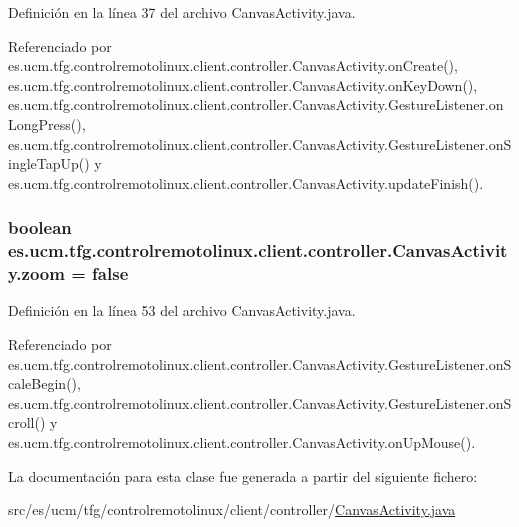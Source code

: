 Definición en la línea 37 del archivo Canvas\-Activity.\-java.



Referenciado por es.\-ucm.\-tfg.\-controlremotolinux.\-client.\-controller.\-Canvas\-Activity.\-on\-Create(), es.\-ucm.\-tfg.\-controlremotolinux.\-client.\-controller.\-Canvas\-Activity.\-on\-Key\-Down(), es.\-ucm.\-tfg.\-controlremotolinux.\-client.\-controller.\-Canvas\-Activity.\-Gesture\-Listener.\-on\-Long\-Press(), es.\-ucm.\-tfg.\-controlremotolinux.\-client.\-controller.\-Canvas\-Activity.\-Gesture\-Listener.\-on\-Single\-Tap\-Up() y es.\-ucm.\-tfg.\-controlremotolinux.\-client.\-controller.\-Canvas\-Activity.\-update\-Finish().

\hypertarget{classes_1_1ucm_1_1tfg_1_1controlremotolinux_1_1client_1_1controller_1_1CanvasActivity_a24f84d52429b8d6256f422a949f76ac2}{
\subsubsection[{zoom}]{\setlength{\rightskip}{0pt plus 5cm}boolean es.\-ucm.\-tfg.\-controlremotolinux.\-client.\-controller.\-Canvas\-Activity.\-zoom = false\hspace{0.3cm}{\ttfamily [private]}}}\label{classes_1_1ucm_1_1tfg_1_1controlremotolinux_1_1client_1_1controller_1_1CanvasActivity_a24f84d52429b8d6256f422a949f76ac2}


Definición en la línea 53 del archivo Canvas\-Activity.\-java.



Referenciado por es.\-ucm.\-tfg.\-controlremotolinux.\-client.\-controller.\-Canvas\-Activity.\-Gesture\-Listener.\-on\-Scale\-Begin(), es.\-ucm.\-tfg.\-controlremotolinux.\-client.\-controller.\-Canvas\-Activity.\-Gesture\-Listener.\-on\-Scroll() y es.\-ucm.\-tfg.\-controlremotolinux.\-client.\-controller.\-Canvas\-Activity.\-on\-Up\-Mouse().



La documentación para esta clase fue generada a partir del siguiente fichero\-:\begin{DoxyCompactItemize}
\item 
src/es/ucm/tfg/controlremotolinux/client/controller/\hyperlink{CanvasActivity_8java}{Canvas\-Activity.\-java}\end{DoxyCompactItemize}
